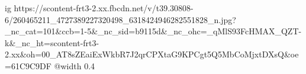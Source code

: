  
 
 
 
 

\ifcmt
  ig https://scontent-frt3-2.xx.fbcdn.net/v/t39.30808-6/260465211_4727389227320498_6318424946282551828_n.jpg?_nc_cat=101&ccb=1-5&_nc_sid=b9115d&_nc_ohc=_qMlS93FcHMAX_QZT-k&_nc_ht=scontent-frt3-2.xx&oh=00_AT8sZEaiExWkbR7J2qrCPXtaG9KPCgt5Q5MbCoMjxtDXsQ&oe=61C9C9DF
  @width 0.4
\fi
